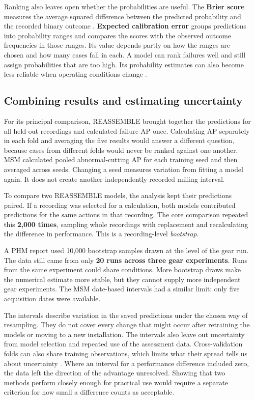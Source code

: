 Ranking also leaves open whether the probabilities are useful. The \textbf{Brier score} measures the average squared difference between the predicted probability and the recorded binary outcome \parencite{P055}. \textbf{Expected calibration error} groups predictions into probability ranges and compares the scores with the observed outcome frequencies in those ranges. Its value depends partly on how the ranges are chosen and how many cases fall in each. A model can rank failures well and still assign probabilities that are too high. Its probability estimates can also become less reliable when operating conditions change \parencite{P008}.

\subsection{Combining results and estimating uncertainty}

For its principal comparison, REASSEMBLE brought together the predictions for all held-out recordings and calculated failure AP once. Calculating AP separately in each fold and averaging the five results would answer a different question, because cases from different folds would never be ranked against one another. MSM calculated pooled abnormal-cutting AP for each training seed and then averaged across seeds. Changing a seed measures variation from fitting a model again. It does not create another independently recorded milling interval.

To compare two REASSEMBLE models, the analysis kept their predictions paired. If a recording was selected for a calculation, both models contributed predictions for the same actions in that recording. The core comparison repeated this \textbf{2,000 times}, sampling whole recordings with replacement and recalculating the difference in performance. This is a recording-level \emph{bootstrap}.

A PHM report used 10,000 bootstrap samples drawn at the level of the gear run. The data still came from only \textbf{20 runs across three gear experiments}. Runs from the same experiment could share conditions. More bootstrap draws make the numerical estimate more stable, but they cannot supply more independent gear experiments. The MSM date-based intervals had a similar limit: only five acquisition dates were available.

The intervals describe variation in the saved predictions under the chosen way of resampling. They do not cover every change that might occur after retraining the models or moving to a new installation. The intervals also leave out uncertainty from model selection and repeated use of the assessment data. Cross-validation folds can also share training observations, which limits what their spread tells us about uncertainty \parencite{Bengio2004CVVariance}. Where an interval for a performance difference included zero, the data left the direction of the advantage unresolved. Showing that two methods perform closely enough for practical use would require a separate criterion for how small a difference counts as acceptable.

